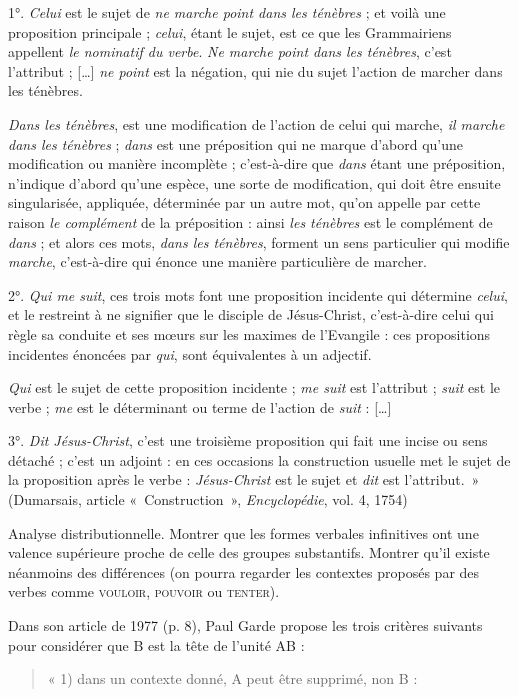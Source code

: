 {    1°. \textit{Celui} est le sujet de \textit{ne marche point dans les ténèbres} ; et voilà une proposition principale ; \textit{celui}, étant le sujet, est ce que les Grammairiens appellent \textit{le nominatif du verbe}. \textit{Ne marche point dans les ténèbres}, c’est l’attribut ; […] \textit{ne point} est la négation, qui nie du sujet l’action de marcher dans les ténèbres.

    \textit{Dans les ténèbres}, est une modification de l’action de celui qui marche, \textit{il marche dans les ténèbres} ; \textit{dans} est une préposition qui ne marque d’abord qu’une modification ou manière incomplète ; c’est-à-dire que \textit{dans} étant une préposition, n’indique d’abord qu’une espèce, une sorte de modification, qui doit être ensuite singularisée, appliquée, déterminée par un autre mot, qu’on appelle par cette raison \textit{le complément} de la préposition : ainsi \textit{les ténèbres} est le complément de \textit{dans} ; et alors ces mots, \textit{dans les ténèbres}, forment un sens particulier qui modifie \textit{marche}, c’est-à-dire qui énonce une manière particulière de marcher.

    2°. \textit{Qui me suit}, ces trois mots font une proposition incidente qui détermine \textit{celui}, et le restreint à ne signifier que le disciple de Jésus-Christ, c’est-à-dire celui qui règle sa conduite et ses mœurs sur les maximes de l’Evangile : ces propositions incidentes énoncées par \textit{qui}, sont équivalentes à un adjectif.

    \textit{Qui} est le sujet de cette proposition incidente ; \textit{me suit} est l’attribut ; \textit{suit} est le verbe ; \textit{me} est le dé​​terminant ou terme de l’action de \textit{suit} : […]

    3°. \textit{Dit Jésus-Christ}, c’est une troisième proposition qui fait une incise ou sens détaché ; c’est un adjoint : en ces occasions la construction usuelle met le sujet de la proposition après le verbe : \textit{Jésus-Christ} est le sujet et \textit{dit} est l’attribut.~» (Dumarsais, article «~Construction~», \textit{Encyclopédie}, vol. 4, 1754)

     Analyse distributionnelle. Montrer que les formes verbales infinitives ont une valence supérieure proche de celle des groupes substantifs. Montrer qu’il existe néanmoins des différences (on pourra regarder les contextes proposés par des verbes comme \textsc{vouloir,} \textsc{pouvoir} ou \textsc{tenter).}

     Dans son article de 1977 (p. 8), Paul Garde propose les trois critères suivants pour considérer que B est la tête de l’unité AB :
    \begin{quote}
        «  1) dans un contexte donné, A peut être supprimé, non B :


\end{quote}}
